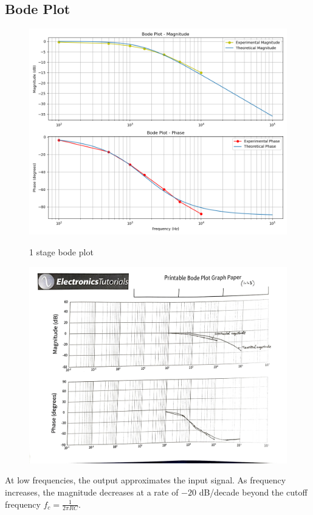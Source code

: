 \documentclass[12pt,a4paper]{report}
\begin{document}
\subsection{Bode Plot}
\begin{figure}[H] %
    \centering
    \includegraphics[width=\textwidth]{figs/1phase.png}\\%
    
    
    \caption{1 stage bode plot}
    \label{fig:bode plot}
\end{figure}
\begin{figure}
    \centering
    \includegraphics[width=\linewidth]{figs/1draw.jpg}
    
    \label{fig:enter-label}
\end{figure}
At low frequencies, the output approximates the input signal. As frequency increases, the magnitude decreases at a rate of \(-20\) dB/decade beyond the cutoff frequency \( f_c = \frac{1}{2\pi RC} \).
\end{document}
